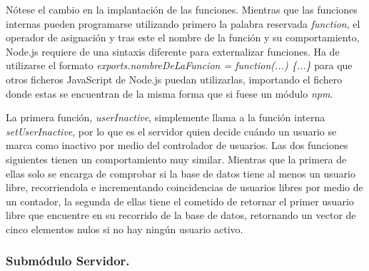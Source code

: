 Nótese el cambio en la implantación de las funciones. Mientras que las funciones internas pueden programarse utilizando primero la palabra reservada \emph{function}, el operador de asignación y tras este el nombre de la función y su comportamiento, Node.js requiere de una sintaxis diferente para externalizar funciones. Ha de utilizarse el formato \emph{exports.nombreDeLaFuncion = function(...) \{...\}} para que otros ficheros JavaScript de Node.js puedan utilizarlas, importando el fichero donde estas se encuentran de la misma forma que si fuese un módulo \emph{npm}.


La primera función, \emph{userInactive}, simplemente llama a la función interna \emph{setUserInactive}, por lo que es el servidor quien decide cuándo un usuario se marca como inactivo por medio del controlador de usuarios. Las dos funciones siguientes tienen un comportamiento muy similar. Mientras que la primera de ellas solo se encarga de comprobar si la base de datos tiene al menos un usuario libre, recorriendola e incrementando coincidencias de usuarios libres por medio de un contador, la segunda de ellas tiene el cometido de retornar el primer usuario libre que encuentre en su recorrido de la base de datos, retornando un vector de cinco elementos nulos si no hay ningún usuario activo.

\subsubsection{Submódulo Servidor.} \label{serverSubmodule}

